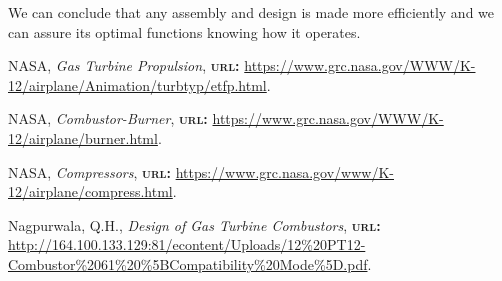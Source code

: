 \documentclass[12pt, letterpaper]{article}
\begin{document}
We can conclude that any assembly and design is made more efficiently and we can assure its optimal functions knowing how it operates. 
\renewcommand\refname{References}
\begin{thebibliography}{}

	NASA, \textit{Gas Turbine Propulsion}, \textsc{\textbf{url:}} \url{https://www.grc.nasa.gov/WWW/K-12/airplane/Animation/turbtyp/etfp.html}.

	NASA, \textit{Combustor-Burner}, \textsc{\textbf{url:}} \url{https://www.grc.nasa.gov/WWW/K-12/airplane/burner.html}.

	NASA, \textit{Compressors}, \textsc{\textbf{url:}} \url{https://www.grc.nasa.gov/www/K-12/airplane/compress.html}.

	Nagpurwala, Q.H.,  \textit{Design of Gas Turbine Combustors}, \textsc{\textbf{url:}} \url{http://164.100.133.129:81/econtent/Uploads/12\%20PT12-Combustor\%2061\%20\%5BCompatibility\%20Mode\%5D.pdf}.

\end{thebibliography}
\end{document}
